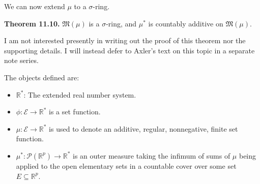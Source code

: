 \documentclass[a4paper]{article}
\newcommand{\R}{\mathbb{R}}
\begin{document}
We can now extend $\mu$ to a $\sigma$-ring.

\textbf{Theorem 11.10.} $\mathfrak{M}(\mu)$ is a $\sigma$-ring, and $\mu^*$ is countably additive on $\mathfrak{M}(\mu)$.

I am not interested presently in writing out the proof of this theorem nor the supporting details. I will instead defer to Axler's text on this topic in a separate note series.

The objects defined are:
\begin{itemize}
    \item $\R^*$: The extended real number system.
    \item $\phi : \mathscr{E} \to \R^*$ is a set function.
    \item $\mu : \mathscr{E} \to \R^*$ is used to denote an additive, regular, nonnegative, finite set function.
    \item $\mu^* : \mathcal{P}(\R^p) \to \R^*$ is an outer measure taking the infimum of sums of $\mu$ being applied to the open elementary sets in a countable cover over some set $E \subseteq \R^p$.
\end{itemize}
\end{document}
